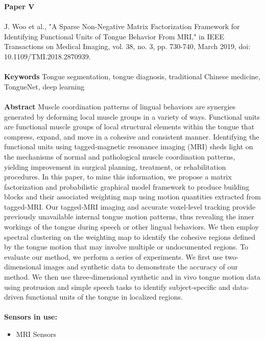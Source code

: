 \noindent
\textbf{Paper V} 
\\ \\
\noindent
J. Woo et al., "A Sparse Non-Negative Matrix Factorization Framework for Identifying Functional Units of Tongue Behavior From MRI," in IEEE Transactions on Medical Imaging, vol. 38, no. 3, pp. 730-740, March 2019, doi: 10.1109/TMI.2018.2870939.\\ \\

\noindent
\textbf{Keywords} Tongue segmentation, tongue diagnosis, traditional Chinese medicine, TongueNet,
deep learning
\\ \\

\noindent
\textbf{Abstract} Muscle coordination patterns of lingual behaviors are synergies generated by deforming local muscle groups in a variety of ways. Functional units are functional muscle groups of local structural elements within the tongue that compress, expand, and move in a cohesive and consistent manner. Identifying the functional units using tagged-magnetic resonance imaging (MRI) sheds light on the mechanisms of normal and pathological muscle coordination patterns, yielding improvement in surgical planning, treatment, or rehabilitation procedures. In this paper, to mine this information, we propose a matrix factorization and probabilistic graphical model framework to produce building blocks and their associated weighting map using motion quantities extracted from tagged-MRI. Our tagged-MRI imaging and accurate voxel-level tracking provide previously unavailable internal tongue motion patterns, thus revealing the inner workings of the tongue during speech or other lingual behaviors. We then employ spectral clustering on the weighting map to identify the cohesive regions defined by the tongue motion that may involve multiple or undocumented regions. To evaluate our method, we perform a series of experiments. We first use two-dimensional images and synthetic data to demonstrate the accuracy of our method. We then use three-dimensional synthetic and in vivo tongue motion data using protrusion and simple speech tasks to identify subject-specific and data-driven functional units of the tongue in localized regions.
\\ \\


\noindent
\textbf{Sensors in use:}
\begin{itemize}
    \item MRI Sensors \\ \\
\end{itemize}


